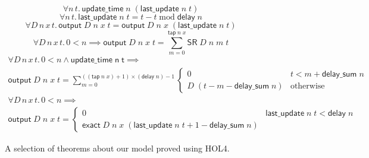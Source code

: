 \documentclass{llncs}
\begin{document}
\begin{figure}
\caption{
A selection of theorems about our model proved using HOL4.
\label{fig:theorems}
}
\begin{equation}\label{update_time_last_update}
\forall{n\,t}.\,\mathsf{update\_time}\;n\;(\mathsf{last\_update}\;n\;t)
\end{equation}
\begin{equation}\label{last_update_thm}
\forall{n\,t}.\,\mathsf{last\_update}\;n\;t=t-t\operatorname{mod}\mathsf{delay}\;n
\end{equation}
\begin{equation}\label{output_last_update}
\forall{D\,n\,x\,t}.\,\mathsf{output}\;D\;n\;x\;t=\mathsf{output}\;D\;n\;x\;(\mathsf{last\_update}\;n\;t)
\end{equation}
\begin{equation}\label{output_sum}
\forall{D\,n\,x\,t}.\,{0<n}\implies\mathsf{output}\;D\;n\;x\;t=\sum_{m=0}^{\mathsf{tap}\;n\;x}\mathsf{SR}\;D\;n\;m\;t
\end{equation}
\begin{multline}\label{output_input_at_update_times}
\forall{D\,n\,x\,t}.\,{0 < n}\land{\mathsf{update\_time\;n\;t}}\implies\\\mathsf{output}\;D\;n\;x\;t=\sum_{m=0}^{((\mathsf{tap}\;n\;x)+1)\times(\mathsf{delay}\;n)-1}\begin{cases}0&t<m+\mathsf{delay\_sum}\;n\\D\;(t-m-\mathsf{delay\_sum}\;n)&\text{otherwise}\end{cases}
\end{multline}
\begin{multline}\label{output_eq_exact}
\forall{D\,n\,x\,t}.\,{0 < n}\implies\\\mathsf{output}\;D\;n\;x\;t=\begin{cases}0&\mathsf{last\_update}\;n\;t<\mathsf{delay}\;n\\\mathsf{exact}\;D\;n\;x\;(\mathsf{last\_update}\;n\;t+1-\mathsf{delay\_sum}\;n)\end{cases}
\end{multline}
\end{figure}

\end{document}
